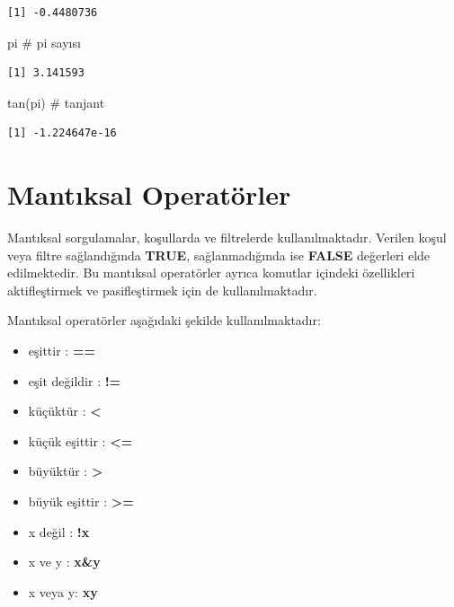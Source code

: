 \documentclass[
  letterpaper,
  DIV=11,
  numbers=noendperiod]{scrreprt}
\newenvironment{Shaded}{\begin{snugshade}}{\end{snugshade}}
\newcommand{\CommentTok}[1]{\textcolor[rgb]{0.37,0.37,0.37}{#1}}
\newcommand{\FunctionTok}[1]{\textcolor[rgb]{0.28,0.35,0.67}{#1}}
\newcommand{\NormalTok}[1]{\textcolor[rgb]{0.00,0.23,0.31}{#1}}
\begin{document}
\begin{verbatim}
[1] -0.4480736
\end{verbatim}

\begin{Shaded}
\begin{Highlighting}[]
\NormalTok{pi }\CommentTok{\# pi sayısı }
\end{Highlighting}
\end{Shaded}

\begin{verbatim}
[1] 3.141593
\end{verbatim}

\begin{Shaded}
\begin{Highlighting}[]
\FunctionTok{tan}\NormalTok{(pi) }\CommentTok{\# tanjant}
\end{Highlighting}
\end{Shaded}

\begin{verbatim}
[1] -1.224647e-16
\end{verbatim}

\section{Mantıksal Operatörler}\label{mantux131ksal-operatuxf6rler}

Mantıksal sorgulamalar, koşullarda ve filtrelerde kullanılmaktadır.
Verilen koşul veya filtre sağlandığında \textbf{TRUE}, sağlanmadığında
ise \textbf{FALSE} değerleri elde edilmektedir. Bu mantıksal operatörler
ayrıca komutlar içindeki özellikleri aktifleştirmek ve pasifleştirmek
için de kullanılmaktadır.

Mantıksal operatörler aşağıdaki şekilde kullanılmaktadır:

\begin{itemize}
\item
  eşittir : \textbf{==}
\item
  eşit değildir : \textbf{!=}
\item
  küçüktür : \textbf{\textless{}}
\item
  küçük eşittir : \textbf{\textless=}
\item
  büyüktür : \textbf{\textgreater{}}
\item
  büyük eşittir : \textbf{\textgreater=}
\item
  x değil : \textbf{!x}
\item
  x ve y : \textbf{x\&y}
\item
  x veya y: \textbf{x\textbar y}
\end{itemize}
\end{document}
